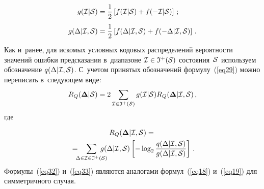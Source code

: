 \begin{multicols}{2}
\noindent
\begin{align*}
g({\cal I}|{\cal S}) &= \displaystyle\frac{\displaystyle 1\mathstrut}{\displaystyle 2\mathstrut} \left[ 
f({\cal I}|{\cal S}) + f(-{\cal I}|{\cal S}) \right]\,; \\
g(\Delta|{\cal I},{\cal S}) &=
\displaystyle\frac{\displaystyle 1\mathstrut}{\displaystyle 2\mathstrut} \left[ f(\Delta|{\cal I},{\cal S}) + f(-\Delta|{\cal I},{\cal S}) \right]\,.
\end{align*}
Как и~ранее, для искомых условных кодовых распределений вероятности значений ошибки 
предсказания в~диапазоне ${\cal I}\hm\in{\frak I}^+({\cal S})$ состояния~${\cal S}$ 
использу\-ем обозначение $q(\Delta|{\cal I},{\cal S})$. С~учетом принятых обозначений 
формулу~(\ref{eq29}) можно переписать в~следующем виде:
\begin{equation}
\label{eq32}
R_Q(\boldsymbol{\Delta}|{\cal S}) = 2 \sum\limits_{{\cal I}\in{\frak I}^+({\cal S})}
g({\cal I}|{\cal S}) R_Q(\boldsymbol{\Delta}|{\cal I},{\cal S})\,,
\end{equation}
где

\vspace*{-4pt}

\noindent
\begin{multline}
\label{eq33}
R_Q(\boldsymbol{\Delta}|{\cal I},{\cal S}) = {}\\
{}=\hspace*{-2mm}
\sum\limits_{\Delta\in{\cal I}\in{\frak I}^+({\cal S)}}\hspace*{-4mm}
g(\Delta|{\cal I},{\cal S})
\left[-\log_{2}\fr{q(\Delta|{\cal I},{\cal S})}{g(\Delta|{\cal I},{\cal S})}\right]\,.
\end{multline}
Формулы~(\ref{eq32}) и~(\ref{eq33}) являются аналогами формул~(\ref{eq18}) 
и~(\ref{eq19}) для симметричного случая.

\begin{table*}\small
\begin{center}
\label{tab3}
\vspace*{2ex}


\end{center}
\end{table*}
\end{multicols}
